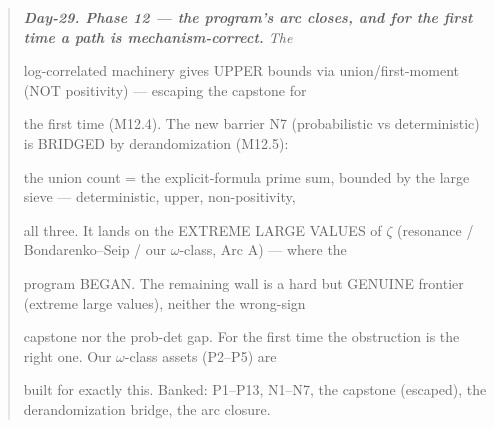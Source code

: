 \documentclass[10pt]{article}
\begin{document}
\begin{quote}\itshape
\textbf{Day-29. Phase 12 --- the program's arc closes, and for the first time a path is mechanism-correct.} The\par
log-correlated machinery gives UPPER bounds via union/first-moment (NOT positivity) --- escaping the capstone for\par
the first time (M12.4). The new barrier N7 (probabilistic vs deterministic) is BRIDGED by derandomization (M12.5):\par
the union count = the explicit-formula prime sum, bounded by the large sieve --- deterministic, upper, non-positivity,\par
all three. It lands on the EXTREME LARGE VALUES of \ensuremath{\zeta} (resonance / Bondarenko--Seip / our \ensuremath{\omega}-class, Arc A) --- where the\par
program BEGAN. The remaining wall is a hard but GENUINE frontier (extreme large values), neither the wrong-sign\par
capstone nor the prob-det gap. For the first time the obstruction is the right one. Our \ensuremath{\omega}-class assets (P2--P5) are\par
built for exactly this. Banked: P1--P13, N1--N7, the capstone (escaped), the derandomization bridge, the arc closure.\par
\end{quote}
\end{document}
